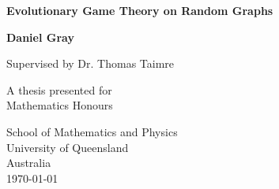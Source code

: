 \begin{titlepage}
    \begin{center}
        \vspace*{1cm}
        
        \Huge
        \textbf{Evolutionary Game Theory on Random Graphs}
        
        \vspace{0.5cm}
        \LARGE
        
        \vspace{1.5cm}
        
        \textbf{Daniel Gray}
        
        \LARGE
        Supervised by Dr. Thomas Taimre
        
        \vspace{1.5cm}
        
        \vfill
        
        A thesis presented for \\ Mathematics Honours
        
        \vspace{0.8cm}
        

        
        \Large
        School of Mathematics and Physics\\
        University of Queensland\\
        Australia\\
        \today
        
    \end{center}
\end{titlepage}